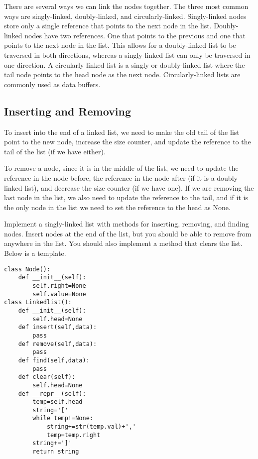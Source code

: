 There are several ways we can link the nodes together.  The three most common ways are singly-linked, doubly-linked, and circularly-linked.  
Singly-linked nodes store only a single reference that points to the next node in the list.  
Doubly-linked nodes have two references.
One that points to the previous and one that points to the next node in the list.  
This allows for a doubly-linked list to be traversed in both directions, whereas a singly-linked list can only be traversed in one direction. 
A circularly linked list is a singly or doubly-linked list where the tail node points to the head node as the next node.  
Circularly-linked lists are commonly used as data buffers.

\subsection*{Inserting and Removing}

To insert into the end of a linked list, we need to make the old tail of the list point to the new node, increase the size counter, and update the reference to the tail of the list (if we have either).

To remove a node, since it is in the middle of the list, we need to update the reference in the node before, the reference in the node after (if it is a doubly linked list), and decrease the size counter (if we have one).
If we are removing the last node in the list, we also need to update the reference to the tail, and if it is the only node in the list we need to set the reference to the head as None.


\begin{problem}
Implement a singly-linked list with methods for inserting, removing, and finding nodes. Insert nodes at the end of the list, but you should be able to remove from anywhere in the list. You should also implement a method that clears the list. Below is a template.
\begin{lstlisting}
class Node():
    def __init__(self):
        self.right=None
        self.value=None
class Linkedlist():
    def __init__(self):
        self.head=None
    def insert(self,data):
        pass
    def remove(self,data):
        pass
    def find(self,data):
        pass
    def clear(self):
        self.head=None
    def __repr__(self):
        temp=self.head
        string='['
        while temp!=None:
            string+=str(temp.val)+','
            temp=temp.right
        string+=']'
        return string
\end{lstlisting}
\end{problem}

